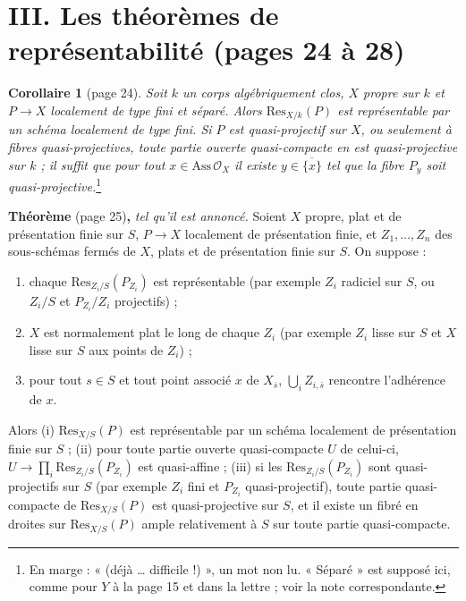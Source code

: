 \documentclass[11pt,a4paper]{article}
\begin{document}
\section*{III. Les théorèmes de représentabilité (pages 24 à 28)}

\textbf{Corollaire 1} (page 24). \emph{Soit $k$ un corps algébriquement clos,
$X$ propre sur $k$ et $P \to X$ localement de type fini et séparé. Alors
$\mathrm{Res}_{X/k}(P)$ est représentable par un schéma localement de type fini.
Si $P$ est quasi-projectif sur $X$, ou seulement à fibres quasi-projectives,
toute partie ouverte quasi-compacte en est quasi-projective sur $k$ ; il suffit
que pour tout $x \in \mathrm{Ass}\,\mathcal{O}_X$ il existe $y \in \overline{\{x\}}$
tel que la fibre $P_y$ soit quasi-projective.}\footnote{En marge :
« (déjà \ldots{} difficile !) », un mot non lu. « Séparé » est supposé ici, comme pour $Y$ à la page 15
et dans la lettre ; voir la note correspondante.}

\textbf{Théorème} (page 25)\textbf{,} \emph{tel qu'il est annoncé.} Soient $X$
propre, plat et de présentation finie sur $S$, $P \to X$ localement de
présentation finie, et $Z_1, \ldots, Z_n$ des sous-schémas fermés de $X$, plats
et de présentation finie sur $S$. On suppose :
\begin{enumerate}
  \item[(a)] chaque $\mathrm{Res}_{Z_i/S}(P_{Z_i})$ est représentable (par
  exemple $Z_i$ radiciel sur $S$, ou $Z_i/S$ et $P_{Z_i}/Z_i$ projectifs) ;
  \item[(b)] $X$ est normalement plat le long de chaque $Z_i$ (par exemple
  $Z_i$ lisse sur $S$ et $X$ lisse sur $S$ aux points de $Z_i$) ;
  \item[(c)] pour tout $s \in S$ et tout point associé $x$ de $X_{\bar s}$,
  $\bigcup_i Z_{i,\bar s}$ rencontre l'adhérence de $x$.
\end{enumerate}
Alors (i) $\mathrm{Res}_{X/S}(P)$ est représentable par un schéma localement de
présentation finie sur $S$ ; (ii) pour toute partie ouverte quasi-compacte $U$
de celui-ci, $U \to \prod_i \mathrm{Res}_{Z_i/S}(P_{Z_i})$ est quasi-affine ;
(iii) si les $\mathrm{Res}_{Z_i/S}(P_{Z_i})$ sont quasi-projectifs sur $S$ (par
exemple $Z_i$ fini et $P_{Z_i}$ quasi-projectif), toute partie quasi-compacte de
$\mathrm{Res}_{X/S}(P)$ est quasi-projective sur $S$, et il existe un fibré en
droites sur $\mathrm{Res}_{X/S}(P)$ ample relativement à $S$ sur toute partie
quasi-compacte.
\end{document}

